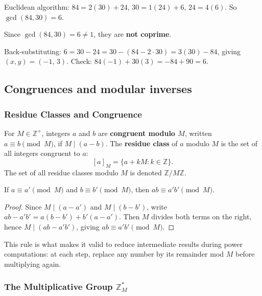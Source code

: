 \begin{example}
Euclidean algorithm: $84 = 2(30) + 24$,\; $30 = 1(24) + 6$,\; $24 = 4(6)$. So $\gcd(84,30)=6$.

Since $\gcd(84,30) = 6 \neq 1$, they are \textbf{not coprime}.

Back-substituting: $6 = 30 - 24 = 30 - (84 - 2\cdot30) = 3(30) - 84$, giving $(x,y) = (-1,\, 3)$. Check: $84(-1) + 30(3) = -84 + 90 = 6$. \checkmark
\end{example}

\subsection{Congruences and modular inverses}

\subsubsection*{Residue Classes and Congruence}

\begin{definition}
For $M \in \mathbb{Z}^+$, integers $a$ and $b$ are \textbf{congruent modulo $M$}, written $a \equiv b \pmod{M}$, if $M \mid (a - b)$. The \textbf{residue class} of $a$ modulo $M$ is the set of all integers congruent to $a$:
\[
[a]_M = \{ a + kM : k \in \mathbb{Z} \}.
\]
The set of all residue classes modulo $M$ is denoted $\mathbb{Z}/M\mathbb{Z}$.
\end{definition}

\begin{theorem}
If $a \equiv a' \pmod{M}$ and $b \equiv b' \pmod{M}$, then $ab \equiv a'b' \pmod{M}$.
\end{theorem}
\begin{proof}
Since $M \mid (a - a')$ and $M \mid (b - b')$, write $ab - a'b' = a(b - b') + b'(a - a')$. Then $M$ divides both terms on the right, hence $M \mid (ab - a'b')$, giving $ab \equiv a'b' \pmod{M}$.
\end{proof}

\begin{remark}
This rule is what makes it valid to reduce intermediate results during power computations: at each step, replace any number by its remainder mod $M$ before multiplying again.
\end{remark}

\subsubsection*{The Multiplicative Group $\mathbb{Z}_M^*$}

